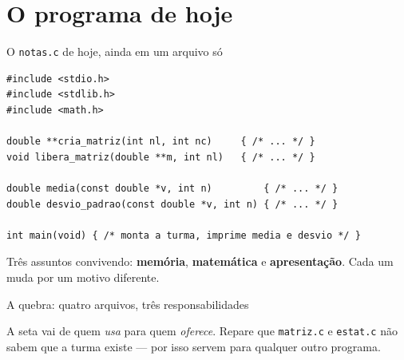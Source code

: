 \documentclass[aspectratio=169]{beamer}
\begin{document}
\section{O programa de hoje}

\begin{frame}[fragile]{O \texttt{notas.c} de hoje, ainda em um arquivo só}
\begin{lstlisting}[basicstyle=\ttfamily\scriptsize]
#include <stdio.h>
#include <stdlib.h>
#include <math.h>

double **cria_matriz(int nl, int nc)     { /* ... */ }
void libera_matriz(double **m, int nl)   { /* ... */ }

double media(const double *v, int n)         { /* ... */ }
double desvio_padrao(const double *v, int n) { /* ... */ }

int main(void) { /* monta a turma, imprime media e desvio */ }
\end{lstlisting}
  \begin{block}{}
    \small Três assuntos convivendo: \textbf{memória}, \textbf{matemática} e
    \textbf{apresentação}. Cada um muda por um motivo diferente.
  \end{block}
\end{frame}

\begin{frame}{A quebra: quatro arquivos, três responsabilidades}
  \begin{center}
  \end{center}
  \begin{block}{}
    \small A seta vai de quem \emph{usa} para quem \emph{oferece}. Repare que
    \texttt{matriz.c} e \texttt{estat.c} não sabem que a turma existe --- por
    isso servem para qualquer outro programa.
  \end{block}
\end{frame}
\end{document}

